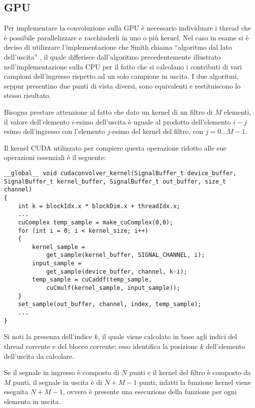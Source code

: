 \subsection{GPU}
Per implementare la convoluzione sulla GPU è necessario individuare i thread che è possibile parallelizzare e racchiuderli in uno o più kernel. Nel caso in esame si è deciso di utilizzare l'implementazione che Smith chiama ``algoritmo dal lato dell'uscita'' \cite[pp.~116-121]{dspguide}, il quale differisce dall'algoritmo precedentemente illustrato nell'implementazione sulla CPU per il fatto che si calcolano i contributi di vari campioni dell'ingresso rispetto ad un solo campione in uscita. I due algoritmi, seppur presentino due punti di vista diversi, sono equivalenti e restituiscono lo stesso risultato.

Bisogna prestare attenzione al fatto che dato un kernel di un filtro di $M$ elementi, il valore dell'elemento $i$-esimo dell'uscita è uguale al prodotto dell'elemento $i-j$ esimo dell'ingresso con l'elemento $j$-esimo del kernel del filtro, con $j = 0 ... M-1$.

Il kernel CUDA utilizzato per compiere questa operazione ridotto alle sue operazioni essenziali è il seguente:

\begin{lstlisting}
__global__ void cudaconvolver_kernel(SignalBuffer_t device_buffer, SignalBuffer_t kernel_buffer, SignalBuffer_t out_buffer, size_t channel)
{
    int k = blockIdx.x * blockDim.x + threadIdx.x;
    ...
    cuComplex temp_sample = make_cuComplex(0,0);
    for (int i = 0; i < kernel_size; i++)
    {
        kernel_sample =
            get_sample(kernel_buffer, SIGNAL_CHANNEL, i);
        input_sample =
            get_sample(device_buffer, channel, k-i);
        temp_sample = cuCaddf(temp_sample,
            cuCmulf(kernel_sample, input_sample));
    }
    set_sample(out_buffer, channel, index, temp_sample);
    ...
}
\end{lstlisting}

Si noti la presenza dell'indice $k$, il quale viene calcolato in base agli indici del thread corrente e del blocco corrente; esso identifica la posizione $k$ dell'elemento dell'uscita da calcolare. 

Se il segnale in ingresso è composto di $N$ punti e il kernel del filtro è composto da $M$ punti, il segnale in uscita è di $N+M-1$ punti; infatti la funzione kernel viene eseguita $N+M-1$, ovvero è presente una esecuzione della funzione per ogni elemento in uscita.

